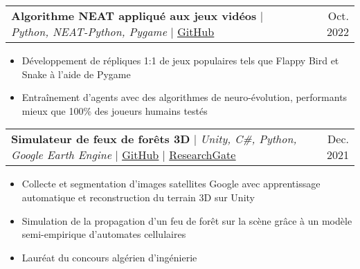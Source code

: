 \documentclass[letterpaper,10.5t]{article}
\makeatletter
\newcommand{\resumeItem}[1]{
  \item\small{
    {#1 \vspace{-2pt}}
  }
}
\newcommand{\resumeProjectHeading}[2]{
    \item
    \begin{tabular*}{0.97\textwidth}{l@{\extracolsep{\fill}}r}
      \small#1 & #2 \\
    \end{tabular*}\vspace{-7pt}
}
\newcommand{\resumeItemListStart}{\begin{itemize}}
\newcommand{\resumeItemListEnd}{\end{itemize}\vspace{-5pt}}
\makeatother
\begin{document}

          
        \resumeProjectHeading
        {\textbf{Algorithme NEAT appliqué aux jeux vidéos} $|$ \emph{Python, NEAT-Python, Pygame} $|$ \href{https://github.com/Somnef/snake_neat_ai}{\underline{GitHub}}}{Oct. 2022}
            \resumeItemListStart
                \resumeItem{Développement de répliques 1:1 de jeux populaires tels que Flappy Bird et Snake à l'aide de Pygame}
                \resumeItem{Entraînement d'agents avec des algorithmes de neuro-évolution, performants mieux que 100\% des joueurs humains testés}
            \resumeItemListEnd

        \resumeProjectHeading
            {\textbf{Simulateur de feux de forêts 3D} $|$ \emph{Unity, C\#, Python, Google Earth Engine} $|$ \href{https://github.com/Somnef/semi-empirical-wildfire-simulation}{\underline{GitHub}} $|$ \href{https://www.researchgate.net/publication/354678516_Applying_semi-empirical_simulation_of_wildfire_on_real_world_satellite_imagery_data}{\underline{ResearchGate}}}{Dec. 2021}
                \resumeItemListStart
                    \resumeItem{Collecte et segmentation d'images satellites Google avec apprentissage automatique et reconstruction du terrain 3D sur Unity}
                    \resumeItem{Simulation de la propagation d'un feu de forêt sur la scène grâce à un modèle semi-empirique d'automates cellulaires}
                    \resumeItem{Lauréat du concours algérien d'ingénierie}
                \resumeItemListEnd
\end{document}
